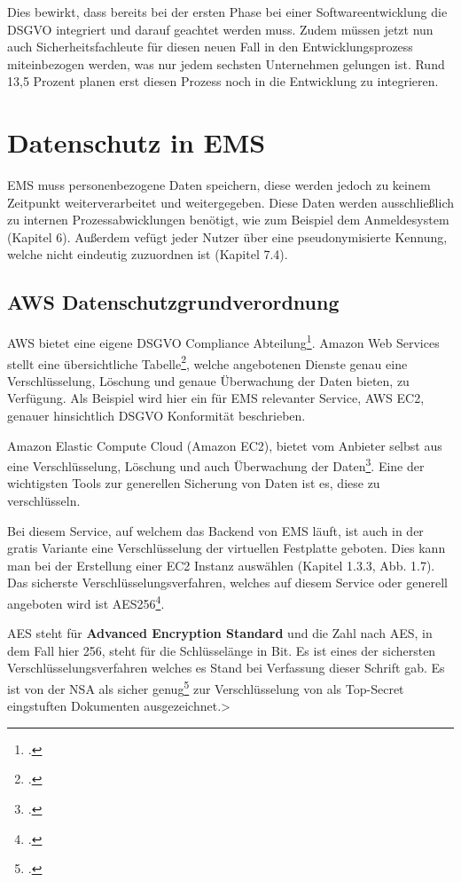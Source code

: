 Dies bewirkt, dass bereits bei der ersten Phase bei einer Softwareentwicklung die DSGVO integriert und darauf geachtet werden muss.
Zudem müssen jetzt nun auch Sicherheitsfachleute für diesen neuen Fall in den Entwicklungsprozess miteinbezogen werden, was nur jedem sechsten Unternehmen gelungen ist.
Rund 13,5 Prozent planen erst diesen Prozess noch in die Entwicklung zu integrieren.
\section{Datenschutz in EMS}
EMS muss personenbezogene Daten speichern, diese werden jedoch zu keinem Zeitpunkt weiterverarbeitet und weitergegeben. Diese Daten werden ausschließlich zu internen Prozessabwicklungen benötigt, wie zum Beispiel dem
Anmeldesystem (Kapitel 6). Außerdem vefügt jeder Nutzer über eine pseudonymisierte Kennung, welche nicht eindeutig zuzuordnen ist (Kapitel 7.4).
\subsection{AWS Datenschutzgrundverordnung}
AWS bietet eine eigene DSGVO Compliance Abteilung\footcite{aws-dsgvo}. Amazon Web Services stellt eine übersichtliche Tabelle\footcite{AWS-DSGVO-Tabelle}, welche angebotenen Dienste genau eine Verschlüsselung, Löschung und 
genaue Überwachung der Daten bieten, zu Verfügung. Als Beispiel wird hier ein für EMS relevanter Service, AWS EC2, genauer hinsichtlich DSGVO Konformität beschrieben.

Amazon Elastic Compute Cloud (Amazon EC2), bietet vom Anbieter selbst aus eine Verschlüsselung, Löschung und auch Überwachung der Daten\footcite{aws-ec2-dsgvo-alles}.
Eine der wichtigsten Tools zur generellen Sicherung von Daten ist es, diese zu verschlüsseln.

Bei diesem Service, auf welchem das Backend von EMS läuft, ist auch in der gratis Variante eine Verschlüsselung der virtuellen Festplatte geboten. Dies kann man bei der Erstellung einer EC2 Instanz auswählen
(Kapitel 1.3.3, Abb. 1.7). Das sicherste Verschlüsselungsverfahren, welches auf diesem Service oder generell angeboten wird ist AES256\footcite{aes256}.

AES steht für \textbf{Advanced Encryption Standard} und die Zahl nach AES, in dem
Fall hier 256, steht für die Schlüsselänge in Bit. Es ist eines der sichersten Verschlüsselungsverfahren welches es Stand bei Verfassung dieser Schrift gab. Es ist von der NSA als sicher genug\footcite{nsa-aws} zur Verschlüsselung von als Top-Secret
eingstuften Dokumenten ausgezeichnet.>


